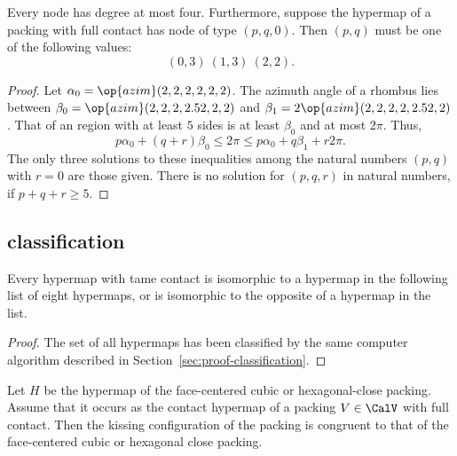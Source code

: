 \begin{lemma}[]\label{lemma:no-5} 
  Every node has degree at most four.  Furthermore, suppose the
  hypermap of a  packing with full contact has node of type
  $(p,q,0)$.  Then $(p,q)$ must be one of the following values:
\begin{displaymath}
(0,3)~(1,3)~(2,2).
\end{displaymath}
\end{lemma}

\begin{proof} Let $\alpha_0 = \op{azim}(2,2,2,2,2,2)$.  The azimuth
  angle of a rhombus lies between $\beta_0 =
  \op{azim}(2,2,2,2.52,2,2)$ and $\beta_1 =
  2\op{azim}(2,2,2,2,2.52,2)$.  That of an region with at least $5$
  sides is at least $\beta_0$ and at most $2\pi$.  Thus,
\begin{displaymath}
p\alpha_0 + (q+r) \beta_0 \le 2\pi \le p\alpha_0 + q\beta_1 + r 2\pi.
\end{displaymath}
The only three solutions to these inequalities among the natural
numbers $(p,q)$ with $r=0$ are those given. There is no solution for
$(p,q,r)$ in natural numbers, if $p+q+r\ge 5$.
\end{proof}






\subsection{classification}


\begin{lemma}
  \label{lemma:contact-classification} Every hypermap with tame contact is isomorphic to
  a hypermap in the following list of eight hypermaps, or is
  isomorphic to the opposite of a hypermap in the list.
\end{lemma}

\begin{proof}
The set of all hypermaps has been classified by the same computer algorithm described in
Section~\ref{sec:proof-classification}.  %
%
%
\end{proof}

\begin{lemma}[]\label{lemma:kiss-fcc} Let $H$ be the
  hypermap of the face-centered cubic or hexagonal-close packing.
  Assume that it occurs as the contact hypermap of a  packing $V\in\CalV$
  with full contact.  Then the kissing configuration of the 
  packing is congruent to that of the face-centered cubic or hexagonal
  close packing.
\end{lemma}
%
%
%
%
%

